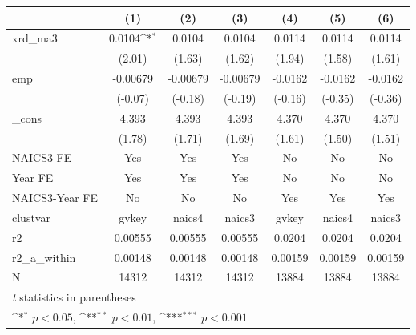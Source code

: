 {
\def\sym#1{\ifmmode^{#1}\else\(^{#1}\)\fi}
\begin{tabular}{l*{6}{c}}
\hline\hline
            &\multicolumn{1}{c}{(1)}         &\multicolumn{1}{c}{(2)}         &\multicolumn{1}{c}{(3)}         &\multicolumn{1}{c}{(4)}         &\multicolumn{1}{c}{(5)}         &\multicolumn{1}{c}{(6)}         \\
\hline
xrd\_ma3     &      0.0104\sym{*}  &      0.0104         &      0.0104         &      0.0114         &      0.0114         &      0.0114         \\
            &      (2.01)         &      (1.63)         &      (1.62)         &      (1.94)         &      (1.58)         &      (1.61)         \\
[1em]
emp         &    -0.00679         &    -0.00679         &    -0.00679         &     -0.0162         &     -0.0162         &     -0.0162         \\
            &     (-0.07)         &     (-0.18)         &     (-0.19)         &     (-0.16)         &     (-0.35)         &     (-0.36)         \\
[1em]
\_cons      &       4.393         &       4.393         &       4.393         &       4.370         &       4.370         &       4.370         \\
            &      (1.78)         &      (1.71)         &      (1.69)         &      (1.61)         &      (1.50)         &      (1.51)         \\
[1em]
NAICS3 FE   &         Yes         &         Yes         &         Yes         &          No         &          No         &          No         \\
[1em]
Year FE     &         Yes         &         Yes         &         Yes         &          No         &          No         &          No         \\
[1em]
NAICS3-Year FE&          No         &          No         &          No         &         Yes         &         Yes         &         Yes         \\
\hline
clustvar    &       gvkey         &      naics4         &      naics3         &       gvkey         &      naics4         &      naics3         \\
r2          &     0.00555         &     0.00555         &     0.00555         &      0.0204         &      0.0204         &      0.0204         \\
r2\_a\_within &     0.00148         &     0.00148         &     0.00148         &     0.00159         &     0.00159         &     0.00159         \\
N           &       14312         &       14312         &       14312         &       13884         &       13884         &       13884         \\
\hline\hline
\multicolumn{7}{l}{\footnotesize \textit{t} statistics in parentheses}\\
\multicolumn{7}{l}{\footnotesize \sym{*} \(p<0.05\), \sym{**} \(p<0.01\), \sym{***} \(p<0.001\)}\\
\end{tabular}
}
